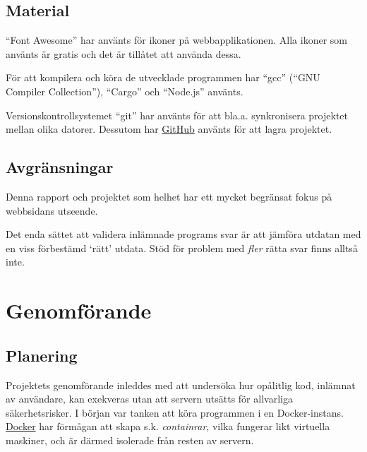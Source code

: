 \documentclass{article}
\begin{document}
\subsection{Material}

``Font Awesome'' har använts för ikoner på webbapplikationen. Alla ikoner som
använts är gratis och det är tillåtet att använda dessa.

För att kompilera och köra de utvecklade programmen har ``gcc'' (``GNU Compiler
Collection''), ``Cargo'' och ``Node.js'' använts.

Versionskontrollsystemet ``git'' har använts för att bla.a. synkronisera
projektet mellan olika datorer. Dessutom har \href{https://github.com/}{GitHub}
använts för att lagra projektet.


\subsection{Avgränsningar}

Denna rapport och projektet som helhet har ett mycket begränsat fokus på
webbsidans utseende.

Det enda sättet att validera inlämnade programs svar är att jämföra utdatan med
en viss förbestämd `rätt' utdata. Stöd för problem med \textit{fler} rätta svar
finns alltså inte.

\section{Genomförande}

\subsection{Planering}

Projektets genomförande inleddes med att undersöka hur opålitlig kod, inlämnat
av användare, kan exekveras utan att servern utsätts för allvarliga
säkerhetsrisker. I början var tanken att köra programmen i en Docker-instans.
\href{https://www.docker.com}{Docker} har förmågan att skapa s.k.
\textit{containrar}, vilka fungerar likt virtuella maskiner, och är därmed
isolerade från resten av servern.
\end{document}

